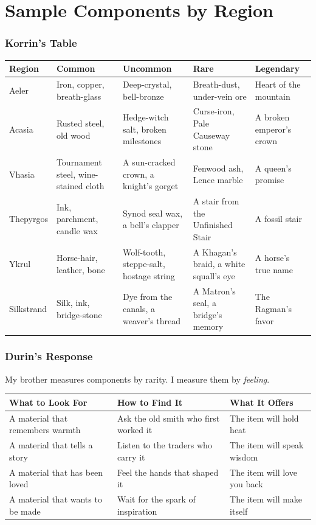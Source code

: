 \documentclass[11pt]{book}
\begin{document}
\newpage
\appendix
\chapter{Sample Components by Region}

\subsection*{Korrin's Table}

\begin{table}[h]
\centering
\begin{tabular}{@{}lllll@{}}
\toprule
\textbf{Region} & \textbf{Common} & \textbf{Uncommon} & \textbf{Rare} & \textbf{Legendary} \\
\midrule
Aeler & Iron, copper, breath-glass & Deep-crystal, bell-bronze & Breath-dust, under-vein ore & Heart of the mountain \\
Acasia & Rusted steel, old wood & Hedge-witch salt, broken milestones & Curse-iron, Pale Causeway stone & A broken emperor's crown \\
Vhasia & Tournament steel, wine-stained cloth & A sun-cracked crown, a knight's gorget & Fenwood ash, Lence marble & A queen's promise \\
Thepyrgos & Ink, parchment, candle wax & Synod seal wax, a bell's clapper & A stair from the Unfinished Stair & A fossil stair \\
Ykrul & Horse-hair, leather, bone & Wolf-tooth, steppe-salt, hostage string & A Khagan's braid, a white squall's eye & A horse's true name \\
Silkstrand & Silk, ink, bridge-stone & Dye from the canals, a weaver's thread & A Matron's seal, a bridge's memory & The Ragman's favor \\
\bottomrule
\end{tabular}
\end{table}

\subsection*{Durin's Response}

My brother measures components by rarity. I measure them by \textit{feeling}.

\begin{table}[h]
\centering
\begin{tabular}{@{}lll@{}}
\toprule
\textbf{What to Look For} & \textbf{How to Find It} & \textbf{What It Offers} \\
\midrule
A material that remembers warmth & Ask the old smith who first worked it & The item will hold heat \\
A material that tells a story & Listen to the traders who carry it & The item will speak wisdom \\
A material that has been loved & Feel the hands that shaped it & The item will love you back \\
A material that wants to be made & Wait for the spark of inspiration & The item will make itself \\
\bottomrule
\end{tabular}
\end{table}
\end{document}
